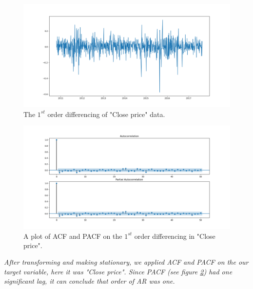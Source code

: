 \begin{figure}[H]
    \centering
    \begin{minipage}[b]{1\textwidth}
        \includegraphics[width=\textwidth]{figures/Ass2/Ass2_Q4_1diff_Close_signal.png}
    \end{minipage}
    \caption{The $1^{st}$ order differencing of "Close price" data.}
    \label{fig:Ass2_Q4_1diff_Close_signal}
\end{figure}

\begin{figure}[H]
    \centering
    \begin{minipage}[b]{1\textwidth}
        \includegraphics[width=\textwidth]{figures/Ass2/Ass2_Q3_PACF_ACF_1diff.png}
    \end{minipage}
    \caption{A plot of \gls{ACF} and \gls{PACF} on the $1^{st}$ order differencing in "Close price".}
    \label{fig:Ass2_Q4_PACF_ACF_1diff}
\end{figure}

\textit{After transforming and making stationary, we applied 
\gls{ACF} and \gls{PACF} on the our target variable, here it was "Close price". Since PACF (see figure \ref{fig:Ass2_Q4_PACF_ACF_1diff}) had one significant lag, it can conclude that order of AR was one.}

